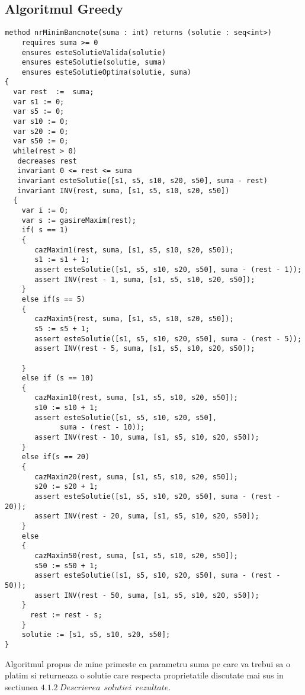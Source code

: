 \subsection{Algoritmul Greedy}
\begin{lstlisting}
method nrMinimBancnote(suma : int) returns (solutie : seq<int>)
	requires suma >= 0
	ensures esteSolutieValida(solutie)
	ensures esteSolutie(solutie, suma)
	ensures esteSolutieOptima(solutie, suma)
{
  var rest  :=  suma;
  var s1 := 0;
  var s5 := 0;
  var s10 := 0;
  var s20 := 0;
  var s50 := 0;
  while(rest > 0)
   decreases rest
   invariant 0 <= rest <= suma
   invariant esteSolutie([s1, s5, s10, s20, s50], suma - rest)
   invariant INV(rest, suma, [s1, s5, s10, s20, s50])
  {
 	var i := 0;
	var s := gasireMaxim(rest);
	if( s == 1)
	{
	   cazMaxim1(rest, suma, [s1, s5, s10, s20, s50]);
	   s1 := s1 + 1;
	   assert esteSolutie([s1, s5, s10, s20, s50], suma - (rest - 1));
	   assert INV(rest - 1, suma, [s1, s5, s10, s20, s50]);
	}
	else if(s == 5)
	{
	   cazMaxim5(rest, suma, [s1, s5, s10, s20, s50]);
	   s5 := s5 + 1;
	   assert esteSolutie([s1, s5, s10, s20, s50], suma - (rest - 5));
	   assert INV(rest - 5, suma, [s1, s5, s10, s20, s50]);
			
	}
	else if (s == 10)
	{
	   cazMaxim10(rest, suma, [s1, s5, s10, s20, s50]);
	   s10 := s10 + 1;
	   assert esteSolutie([s1, s5, s10, s20, s50],
	   		 suma - (rest - 10));
	   assert INV(rest - 10, suma, [s1, s5, s10, s20, s50]);	
	}
	else if(s == 20)
	{
	   cazMaxim20(rest, suma, [s1, s5, s10, s20, s50]);
	   s20 := s20 + 1;
	   assert esteSolutie([s1, s5, s10, s20, s50], suma - (rest - 20));
       assert INV(rest - 20, suma, [s1, s5, s10, s20, s50]);
	}
	else
	{
	   cazMaxim50(rest, suma, [s1, s5, s10, s20, s50]);
	   s50 := s50 + 1;
	   assert esteSolutie([s1, s5, s10, s20, s50], suma - (rest - 50));
	   assert INV(rest - 50, suma, [s1, s5, s10, s20, s50]);
	}
	  rest := rest - s;
	}
	solutie := [s1, s5, s10, s20, s50];
}
\end{lstlisting}
\par 
Algoritmul propus de mine primeste ca parametru suma pe care va trebui sa o platim si returneaza o solutie care respecta proprietatile discutate mai sus in sectiunea $4.1.2 \ Descrierea \ \ solutiei \ \ rezultate $.
 \par 



















